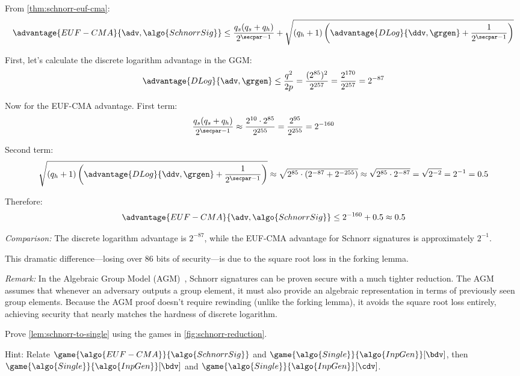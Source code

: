 \ifsolutions
\begin{mysolution}
  From \autoref{thm:schnorr-euf-cma}:
  \[
    \advantage{EUF-CMA}{\adv, \algo{SchnorrSig}} \leq \frac{q_s(q_s + q_h)}{2^{\secpar-1}} + \sqrt{(q_h + 1) \left(\advantage{DLog}{\ddv, \grgen} + \frac{1}{2^{\secpar-1}}\right)}
  \]
  
  First, let's calculate the discrete logarithm advantage in the GGM:
  \[
    \advantage{DLog}{\adv, \grgen} \leq \frac{q^2}{2p} = \frac{(2^{85})^2}{2^{257}} = \frac{2^{170}}{2^{257}} = 2^{-87}
  \]
  
  Now for the EUF-CMA advantage. First term:
  \[
    \frac{q_s(q_s + q_h)}{2^{\secpar-1}} \approx \frac{2^{10} \cdot 2^{85}}{2^{255}} = \frac{2^{95}}{2^{255}} = 2^{-160}
  \]
  
  Second term:
  \[
    \sqrt{(q_h + 1) \left(\advantage{DLog}{\ddv, \grgen} + \frac{1}{2^{\secpar-1}}\right)} \approx \sqrt{2^{85} \cdot \left(2^{-87} + 2^{-255}\right)} \approx \sqrt{2^{85} \cdot 2^{-87}} = \sqrt{2^{-2}} = 2^{-1} = 0.5
  \]
  
  Therefore:
  \[
    \advantage{EUF-CMA}{\adv, \algo{SchnorrSig}} \leq 2^{-160} + 0.5 \approx 0.5
  \]
  
  \emph{Comparison:} The discrete logarithm advantage is $2^{-87}$, while the EUF-CMA advantage for Schnorr signatures is approximately $2^{-1}$.
  
  This dramatic difference—losing over 86 bits of security—is due to the square root loss in the forking lemma. 
  
  \emph{Remark:} In the Algebraic Group Model (AGM)~\cite{C:FucKilLos18}, Schnorr signatures can be proven secure with a much tighter reduction. The AGM assumes that whenever an adversary outputs a group element, it must also provide an algebraic representation in terms of previously seen group elements. Because the AGM proof doesn't require rewinding (unlike the forking lemma), it avoids the square root loss entirely, achieving security that nearly matches the hardness of discrete logarithm.
\end{mysolution}
\fi

\begin{exercise}\label{ex:schnorr-to-single}
  Prove \autoref{lem:schnorr-to-single} using the games in \autoref{fig:schnorr-reduction}.
  
  Hint: Relate $\game{\algo{EUF-CMA}}{\algo{SchnorrSig}}$ and $\game{\algo{Single}}{\algo{InpGen}}[\bdv]$, then $\game{\algo{Single}}{\algo{InpGen}}[\bdv]$ and $\game{\algo{Single}}{\algo{InpGen}}[\cdv]$.
\end{exercise}

